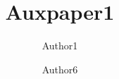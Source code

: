 \documentclass{standalone}
\begin{document}
\author{
  Author1
  \and
  Author6}
\title{Auxpaper1}
\maketitle

\label{pap:auxpaper1}
\begin{abstract}
  \lipsum[6-7]
\end{abstract}
\startcontents[chapters]
\lipsum[30-32]

\printbibliography[segment=\therefsegment,heading=subbibliography]
\stopcontents[chapters]
\end{document}
